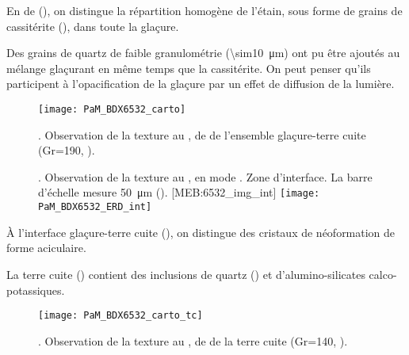 En \carto de \RX (), on distingue la 
répartition homogène de l'étain, sous forme de grains de cassitérite 
(\cassiterite), dans toute la glaçure.

Des grains de quartz de faible granulométrie (\SI{\sim10}{\um}) ont pu 
être ajoutés au mélange glaçurant en même temps que la cassitérite. On 
peut penser qu'ils participent à l'opacification de la glaçure par un 
effet de diffusion de la lumière.

\begin{figure}[htb]
  \texttt{[image: PaM\_BDX6532\_carto]}%
  \caption[\ -- Observation de la texture au \MEB, 
           \carto de \RX de l'ensemble glaçure-terre cuite]
          {\legendeE.
           Observation de la texture au \MEB, 
           \carto de \RX de l'ensemble glaçure-terre cuite 
           (Gr=190, ).}
  \label{MEB:6532_carto_tcgla}
\end{figure}

\begin{figure}[htb]
  \setlength{\imgwidth}{7cm}
  \setlength{\mylength}{1cm+\imgwidth}
  \setlength{\sidecapwidth}{\linewidth-\sidecapsep-\mylength-1cm}
  \renewcommand*{\sidecapfloatwidth}{\mylength}%
  \RaggedLeft
  \begin{sidecaption}{%
    \legendeE.
    Observation de la texture au \MEB, en mode \ERD. 
    Zone d'interface. La barre d'échelle mesure \SI{50}{\um} 
    ().%
  }[MEB:6532_img_int]
    \texttt{[image: PaM\_BDX6532\_ERD\_int]}%
  \end{sidecaption}
\end{figure}

À l'interface glaçure-terre cuite (), on 
distingue des cristaux de néoformation de forme aciculaire.

La terre cuite () contient des inclusions de 
quartz (\quartz) et d'alumino-silicates calco-potassiques.

\begin{figure}[htb]
  \texttt{[image: PaM\_BDX6532\_carto\_tc]}%
  \caption[\ -- Observation de la texture au \MEB, 
           \carto de \RX de la terre cuite]
          {\legendeE.
           Observation de la texture au \MEB, 
           \carto de \RX de la terre cuite 
           (Gr=140, ).}
  \label{MEB:6532_carto_tc}
\end{figure}


